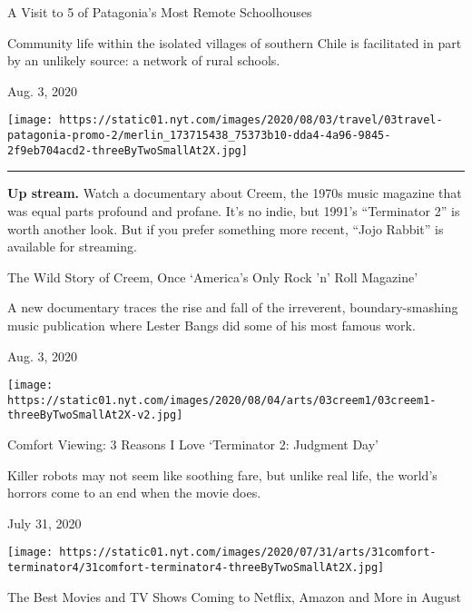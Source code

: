A Visit to 5 of Patagonia's Most Remote Schoolhouses

Community life within the isolated villages of southern Chile is
facilitated in part by an unlikely source: a network of rural schools.

Aug. 3, 2020

\texttt{[image: https://static01.nyt.com/images/2020/08/03/travel/03travel-patagonia-promo-2/merlin\_173715438\_75373b10-dda4-4a96-9845-2f9eb704acd2-threeByTwoSmallAt2X.jpg]}

\begin{center}\rule{0.5\linewidth}{\linethickness}\end{center}

\textbf{Up stream.} Watch a documentary about Creem, the 1970s music
magazine that was equal parts profound and profane. It's no indie, but
1991's ``Terminator 2'' is worth another look. But if you prefer
something more recent, ``Jojo Rabbit'' is available for streaming.

\href{https://www.nytimes.com/2020/08/03/arts/music/creem-magazine-documentary.html?action=click\&module=RelatedLinks\&pgtype=collection}{}

The Wild Story of Creem, Once `America's Only Rock 'n' Roll Magazine'

A new documentary traces the rise and fall of the irreverent,
boundary-smashing music publication where Lester Bangs did some of his
most famous work.

Aug. 3, 2020

\texttt{[image: https://static01.nyt.com/images/2020/08/04/arts/03creem1/03creem1-threeByTwoSmallAt2X-v2.jpg]}

\href{https://www.nytimes.com/2020/07/31/movies/comfort-viewing-terminator-2.html?action=click\&module=RelatedLinks\&pgtype=collection}{}

Comfort Viewing: 3 Reasons I Love `Terminator 2: Judgment Day'

Killer robots may not seem like soothing fare, but unlike real life, the
world's horrors come to an end when the movie does.

July 31, 2020

\texttt{[image: https://static01.nyt.com/images/2020/07/31/arts/31comfort-terminator4/31comfort-terminator4-threeByTwoSmallAt2X.jpg]}

\href{https://www.nytimes.com/2020/07/31/arts/television/new-to-stream-netflix.html?action=click\&module=RelatedLinks\&pgtype=collection}{}

The Best Movies and TV Shows Coming to Netflix, Amazon and More in
August

